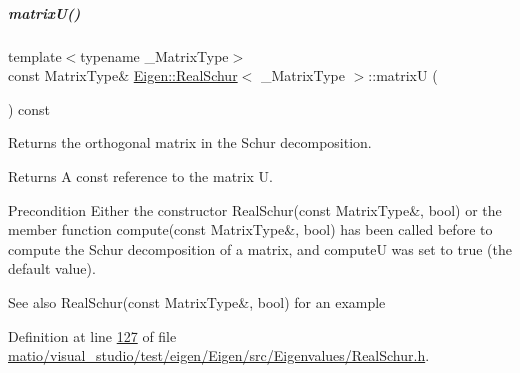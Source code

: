 \mbox{\label{group___eigenvalues___module_a85622ccbecff99c8933d21f0a22b22bb}} 
\subparagraph{\texorpdfstring{matrix\+U()}{matrixU()}\hspace{0.1cm}{\footnotesize\ttfamily [2/2]}}
{\footnotesize\ttfamily template$<$typename \+\_\+\+Matrix\+Type$>$ \\
const Matrix\+Type\& \hyperlink{group___eigenvalues___module_class_eigen_1_1_real_schur}{Eigen\+::\+Real\+Schur}$<$ \+\_\+\+Matrix\+Type $>$\+::matrixU (\begin{DoxyParamCaption}{ }\end{DoxyParamCaption}) const\hspace{0.3cm}{\ttfamily [inline]}}



Returns the orthogonal matrix in the Schur decomposition. 

\begin{DoxyReturn}{Returns}
A const reference to the matrix U.
\end{DoxyReturn}
\begin{DoxyPrecond}{Precondition}
Either the constructor Real\+Schur(const Matrix\+Type\&, bool) or the member function compute(const Matrix\+Type\&, bool) has been called before to compute the Schur decomposition of a matrix, and {\ttfamily computeU} was set to true (the default value).
\end{DoxyPrecond}
\begin{DoxySeeAlso}{See also}
Real\+Schur(const Matrix\+Type\&, bool) for an example 
\end{DoxySeeAlso}


Definition at line \hyperlink{matio_2visual__studio_2test_2eigen_2_eigen_2src_2_eigenvalues_2_real_schur_8h_source_l00127}{127} of file \hyperlink{matio_2visual__studio_2test_2eigen_2_eigen_2src_2_eigenvalues_2_real_schur_8h_source}{matio/visual\+\_\+studio/test/eigen/\+Eigen/src/\+Eigenvalues/\+Real\+Schur.\+h}.

